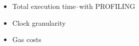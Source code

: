 
\begin{itemize}
\item Total execution time--with PROFILING
\item Clock granularity
\item Gas costs
\end{itemize}
